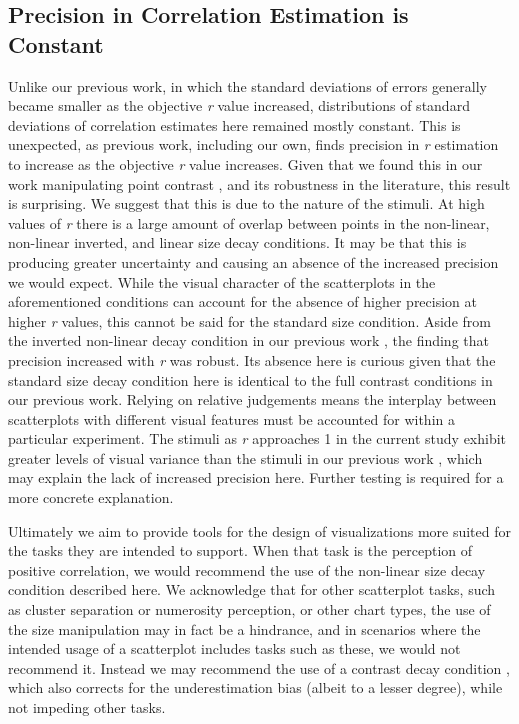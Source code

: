 \documentclass{vgtc}                          %
\begin{document}
\hypertarget{precision-in-correlation-estimation-is-constant}{%
\subsection{Precision in Correlation Estimation is Constant}\label{precision-in-correlation-estimation-is-constant}}

Unlike our previous work, in which the standard deviations of errors generally
became smaller as the objective \emph{r} value increased, distributions of standard
deviations of correlation estimates here remained mostly constant. This
is unexpected, as previous work, including our own, finds precision
in \emph{r} estimation to increase as the objective \emph{r} value increases. Given that we found
this in our work manipulating point contrast \cite{strain_2023}, and
its robustness in the literature, this result is surprising. We suggest that this
is due to the nature of the stimuli. At high values of \emph{r} there is a large amount
of overlap between points in the non-linear, non-linear inverted,
and linear size decay conditions. It may be that this
is producing greater uncertainty and causing an absence of the increased
precision we would expect. While the visual character
of the scatterplots in the aforementioned conditions can account for the absence
of higher precision at higher \emph{r} values, this cannot be said for the standard size
condition. Aside from the inverted non-linear decay condition in
our previous work \cite{strain_2023}, the finding that precision increased with \emph{r}
was robust. Its absence here is curious given that the standard size decay condition
here is identical to the full contrast conditions in our previous work.
Relying on relative judgements means the interplay between scatterplots with
different visual features must be accounted for within a particular experiment.
The stimuli as \emph{r} approaches 1 in the current study exhibit greater levels of
visual variance than the stimuli in our previous work \cite{strain_2023},
which may explain the lack of increased precision here. Further testing is required
for a more concrete explanation.

Ultimately we aim to provide tools for the design of visualizations more suited for the tasks
they are intended to support. When that task is the perception of positive correlation, we would
recommend the use of the non-linear size decay condition described here. We acknowledge that
for other scatterplot tasks, such as cluster separation or numerosity perception, or
other chart types, the use of the size manipulation may in fact be a hindrance, and in scenarios
where the intended usage of a scatterplot includes tasks such as these, we would not
recommend it. Instead we may recommend the use of a contrast decay condition
\cite{strain_2023}, which also corrects for the underestimation bias (albeit to a
lesser degree), while not impeding other tasks.
\end{document}
